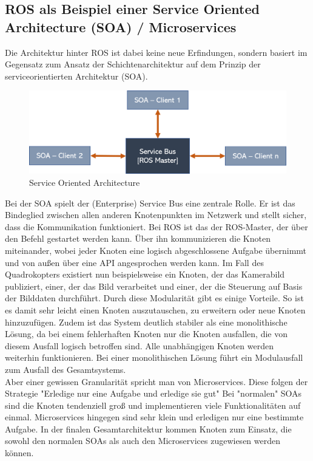 \subsection{ROS als Beispiel einer Service Oriented Architecture (SOA) / Microservices}
Die Architektur hinter ROS ist dabei keine neue Erfindungen, sondern basiert im Gegensatz zum Ansatz der Schichtenarchitektur auf dem Prinzip der serviceorientierten Architektur (SOA). 
\begin{figure}[h]
	\centering
	\includegraphics[scale=0.5]{"Grafiken/soa.png"}
	\caption{Service Oriented Architecture}
	\label{fig:meine-grafik}
\end{figure}
Bei der SOA spielt der (Enterprise) Service Bus eine zentrale Rolle. Er ist das Bindeglied zwischen allen anderen Knotenpunkten im Netzwerk und stellt sicher, dass die Kommunikation funktioniert. Bei ROS ist das der ROS-Master, der über den Befehl  gestartet werden kann. Über ihn kommunizieren die Knoten miteinander, wobei jeder Knoten eine logisch abgeschlossene Aufgabe übernimmt und von außen über eine API angesprochen werden kann. Im Fall des Quadrokopters existiert nun beispielsweise ein Knoten, der das Kamerabild publiziert, einer, der das Bild verarbeitet und einer, der die Steuerung auf Basis der Bilddaten durchführt. Durch diese Modularität gibt es einige Vorteile. So ist es damit sehr leicht einen Knoten auszutauschen, zu erweitern oder neue Knoten hinzuzufügen. Zudem ist das System deutlich stabiler als eine monolithische Lösung, da bei einem fehlerhaften Knoten nur die Knoten ausfallen, die von diesem Ausfall logisch betroffen sind. Alle unabhängigen Knoten werden weiterhin funktionieren. Bei einer monolithischen Lösung führt ein Modulausfall zum Ausfall des Gesamtsystems. \\

Aber einer gewissen Granularität spricht man von Microservices. Diese folgen der Strategie 
"Erledige nur eine Aufgabe und erledige sie gut" %
Bei "normalen" SOAs sind die Knoten tendenziell groß und implementieren viele Funktionalitäten auf einmal. Microservices hingegen sind sehr klein und erledigen nur eine bestimmte Aufgabe. In der finalen Gesamtarchitektur kommen Knoten zum Einsatz, die sowohl den normalen SOAs als auch den Microservices zugewiesen werden können.

